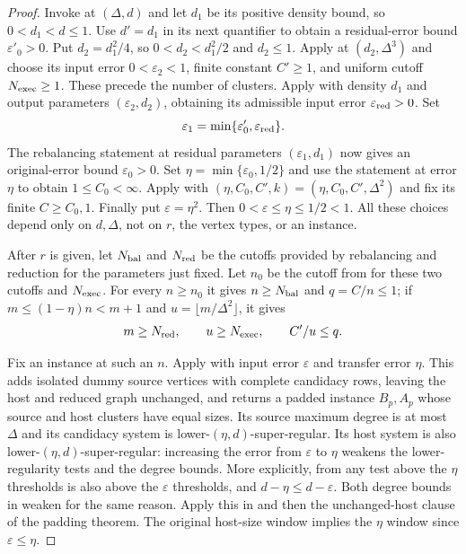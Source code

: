 \begin{proof}
Invoke  at $(\Delta,d)$ and let $d_1$ be its
positive density bound, so $0<d_1<d\leq1$. Use $d'=d_1$ in its next
quantifier to obtain a residual-error bound $\varepsilon'_0>0$.
Put $d_2=d_1^2/4$, so $0<d_2<d_1^2/2$ and $d_2\leq1$.
Apply  at $(d_2,\Delta^3)$ and choose
its input error $0<\varepsilon_2<1$, finite constant $C'\geq1$, and
uniform cutoff $N_{\rm exec}\geq1$. These precede the number of clusters.
Apply  with density $d_1$ and output
parameters $(\varepsilon_2,d_2)$, obtaining its admissible input error
$\varepsilon_{\rm red}>0$. Set
\[
 \varepsilon_1=\min\{\varepsilon'_0,\varepsilon_{\rm red}\}.
\]
The rebalancing statement at residual parameters $(\varepsilon_1,d_1)$
now gives an original-error bound $\varepsilon_0>0$. Set
$\eta=\min\{\varepsilon_0,1/2\}$ and use the statement at error $\eta$
to obtain $1\leq C_0<\infty$. Apply  with
$(\eta,C_0,C',k)=(\eta,C_0,C',\Delta^2)$ and fix its finite $C\geq C_0,1$.
Finally put $\varepsilon=\eta^2$. Then
$0<\varepsilon\leq\eta\leq1/2<1$. All these choices depend only on
$d,\Delta$, not on $r$, the vertex types, or an instance.

After $r$ is given, let $N_{\rm bal}$ and $N_{\rm red}$ be the cutoffs
provided by rebalancing and reduction for the parameters just fixed.
Let $n_0$ be the cutoff from  for these two
cutoffs and $N_{\rm exec}$. For every $n\geq n_0$ it gives
$n\geq N_{\rm bal}$ and $q=C/n\leq1$; if
$m\leq(1-\eta)n<m+1$ and $u=\lfloor m/\Delta^2\rfloor$, it gives
\[
 m\geq N_{\rm red},\qquad u\geq N_{\rm exec},\qquad C'/u\leq q.
\]

Fix an instance at such an $n$. Apply 
with input error $\varepsilon$ and transfer error $\eta$. This adds
isolated dummy source vertices with complete candidacy rows, leaving the
host and reduced graph unchanged, and returns a padded instance $B_p,A_p$
whose source and host clusters have equal sizes. Its source maximum degree
is at most $\Delta$ and its candidacy system is lower-$(\eta,d)$-super-regular.
Its host system is also lower-$(\eta,d)$-super-regular: increasing the
error from $\varepsilon$ to $\eta$ weakens the lower-regularity tests and
the degree bounds. More explicitly, from
 any test above the $\eta$ thresholds is also
above the $\varepsilon$ thresholds, and $d-\eta\leq d-\varepsilon$.
Both degree bounds in  weaken for the
same reason. Apply this in  and then
the unchanged-host clause of the padding theorem. The original host-size
window implies the $\eta$ window since $\varepsilon\leq\eta$.


\end{proof}
